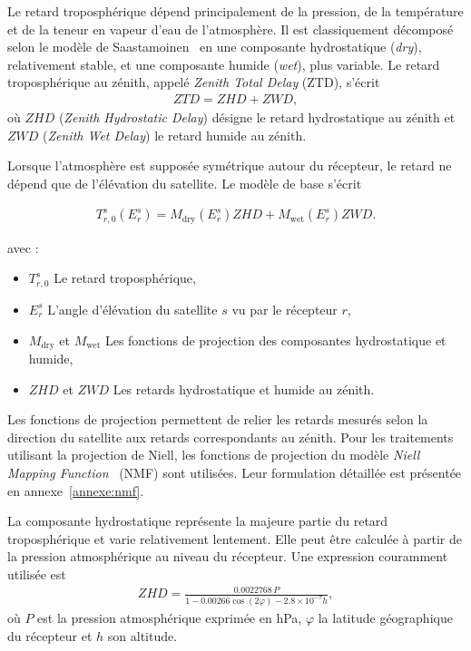 Le retard troposphérique dépend principalement de la pression, de la
température et de la teneur en vapeur d'eau de l'atmosphère. Il est
classiquement décomposé selon le modèle de Saastamoinen~\cite{saastamoinen1972} en une composante hydrostatique (\textit{dry}),
relativement stable, et une composante humide (\textit{wet}), plus variable.
Le retard troposphérique au zénith, appelé \textit{Zenith Total Delay} (ZTD),
s'écrit
\begin{align}
ZTD = ZHD + ZWD,
\label{eq:ztd_decomposition}
\end{align}
où $ZHD$ (\textit{Zenith Hydrostatic Delay}) désigne le retard hydrostatique
au zénith et $ZWD$ (\textit{Zenith Wet Delay}) le retard humide au zénith.

Lorsque l'atmosphère est supposée symétrique autour du récepteur, le retard ne
dépend que de l'élévation du satellite. Le modèle de base s'écrit

\begin{align}
T_{r,0}^s(E_r^s)
=
M_{\mathrm{dry}}(E_r^s)ZHD
+
M_{\mathrm{wet}}(E_r^s)ZWD.
\label{eq:tropo_no_grad}
\end{align}

avec :

\begin{itemize}
    \item $T_{r,0}^s$ Le retard troposphérique,
    \item $E_r^s$ L'angle d'élévation du satellite $s$ vu par le récepteur
    $r$,
    \item $M_{\mathrm{dry}}$ et $M_{\mathrm{wet}}$ Les fonctions de projection
    des composantes hydrostatique et humide,
    \item $ZHD$ et $ZWD$ Les retards hydrostatique et humide au zénith.
\end{itemize}

Les fonctions de projection permettent de relier les retards mesurés selon
la direction du satellite aux retards correspondants au zénith. Pour les traitements utilisant la projection de Niell, les fonctions de projection du modèle \textit{Niell Mapping Function}~\cite{niell1996}
(NMF) sont utilisées. Leur formulation détaillée est présentée en
annexe~\ref{annexe:nmf}.

La composante hydrostatique représente la majeure partie du retard
troposphérique et varie relativement lentement. Elle peut être calculée à
partir de la pression atmosphérique au niveau du récepteur. Une expression
couramment utilisée est
\begin{align}
ZHD
=
\frac{0.0022768\,P}
{1-0.00266\cos(2\varphi)-2.8\times10^{-7}h},
\label{eq:zhd}
\end{align}
où $P$ est la pression atmosphérique exprimée en hPa, $\varphi$ la latitude
géographique du récepteur et $h$ son altitude.

